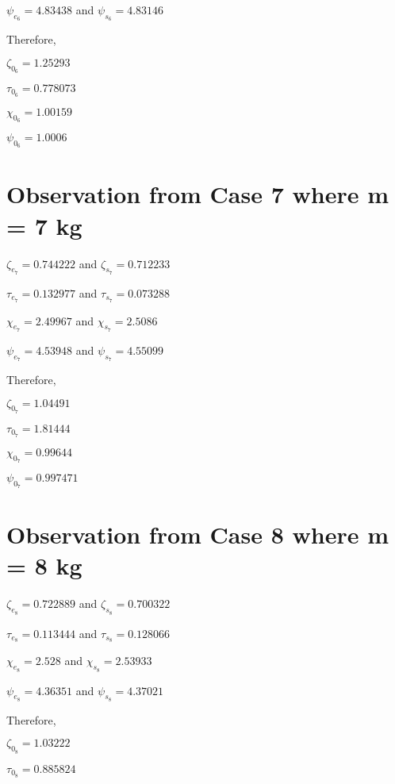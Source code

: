     {$\psi_{e_6} = 4.83438$ and $\psi_{s_6} = 4.83146$}
            
    {Therefore,}
            
    $\zeta_{0_6} = 1.25293$
            
    $\tau_{0_6} = 0.778073$
            
    $\chi_{0_6} = 1.00159$
            
    $\psi_{0_6} = 1.0006$    
            
        
        
\section{{Observation from Case 7 where m = 7 kg}}
        
    {$\zeta_{e_7} = 0.744222$ and $\zeta_{s_7} = 0.712233$}
            
    {$\tau_{e_7} = 0.132977$ and $\tau_{s_7} = 0.073288$}
            
    {$\chi_{e_7} = 2.49967$ and $\chi_{s_7} = 2.5086$}
            
    {$\psi_{e_7} = 4.53948$ and $\psi_{s_7} = 4.55099$}
            
    {Therefore,}
            
    $\zeta_{0_7} = 1.04491$
            
    $\tau_{0_7} = 1.81444$
            
    $\chi_{0_7} = 0.99644$
            
    $\psi_{0_7} = 0.997471$    
            
        
        
\section{{Observation from Case 8 where m = 8 kg}}
        
    {$\zeta_{e_8} = 0.722889$ and $\zeta_{s_8} = 0.700322$}
            
    {$\tau_{e_8} = 0.113444$ and $\tau_{s_8} = 0.128066$}
            
    {$\chi_{e_8} = 2.528$ and $\chi_{s_8} = 2.53933$}
            
    {$\psi_{e_8} = 4.36351$ and $\psi_{s_8} = 4.37021$}
            
    {Therefore,}
            
    $\zeta_{0_8} = 1.03222$
            
    $\tau_{0_8} = 0.885824$
            
